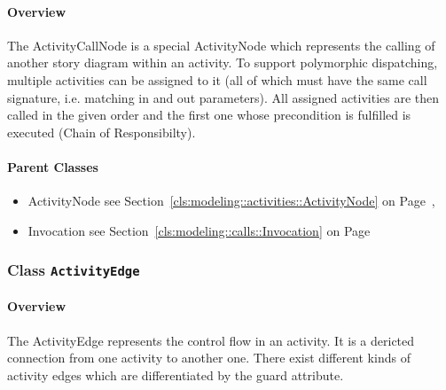 \paragraph{Overview}

	
			
The ActivityCallNode is a special ActivityNode which represents the calling of another story diagram within an activity.
To support polymorphic dispatching, multiple activities can be assigned to it (all of which must have the same call signature, i.e. matching in and out parameters). All assigned activities are then called in the given order and the first one whose precondition is fulfilled is executed (Chain of Responsibilty).	
		
	



\paragraph{Parent Classes}
\begin{itemize}
\item ActivityNode see Section~\ref{cls:modeling::activities::ActivityNode} on Page~\pageref{cls:modeling::activities::ActivityNode}, \item Invocation see Section~\ref{cls:modeling::calls::Invocation} on Page~\pageref{cls:modeling::calls::Invocation}\end{itemize}
\subsubsection{\Large{Class \bfseries \texttt{ActivityEdge}\normalfont}}
\label{cls:modeling::activities::ActivityEdge} 
\paragraph{Overview}

	
			
The ActivityEdge represents the control flow in an activity. It is a dericted connection from one activity to another one. There exist different kinds of activity edges which are differentiated by the guard attribute.	
		
	


